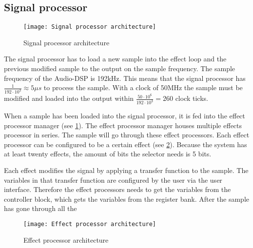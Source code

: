 \subsection{Signal processor}
\begin{figure}[ht]
    \texttt{[image: Signal processor architecture]}
    \caption{Signal processor architecture}
    \label{fig:arch-signal-processor}
\end{figure}

The signal processor has to load a new sample into the effect loop and the previous modified sample to the output on the sample frequency. The sample frequency of the Audio-DSP is 192kHz. This means that the signal processor has $\frac{1}{192 \cdot 10^3} \approx 5 \mu s$ to process the sample. With a clock of 50MHz the sample must be modified and loaded into the output within $\frac{50 \cdot 10^6}{192 \cdot 10^3}=260$ clock ticks.

When a sample has been loaded into the signal processor, it is fed into the effect processor manager (see \ref{fig:arch-signal-processor}). The effect processor manager houses multiple effects processor in series. The sample will go through these effect processors. Each effect processor can be configured to be a certain effect (see \ref{fig:arch-effect-processor}). Because the system has at least twenty effects, the amount of bits the selector needs is 5 bits.

Each effect modifies the signal by applying a transfer function to the sample. The variables in that transfer function are configured by the user via the user interface. Therefore the effect processors needs to get the variables from the controller block, which gets the variables from the register bank. After the sample has gone through all the 

\begin{figure}[ht]
    \texttt{[image: Effect processor architecture]}
    \caption{Effect processor architecture}
    \label{fig:arch-effect-processor}
\end{figure}


